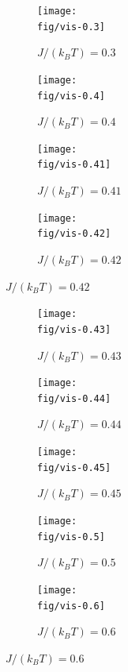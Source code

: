 \documentclass[12pt,a4paper]{article}
\newcommand{\fig}{../fig}
\begin{document}
	\begin{figure}[htb!]
		\centering
		\begin{subfigure}{0.4\linewidth}
			\centering
			\texttt{[image: \\fig/vis-0.3]}
			\caption*{$J/(k_B T) = 0.3$}
		\end{subfigure}
		\begin{subfigure}{0.4\linewidth}
			\centering
			\texttt{[image: \\fig/vis-0.4]}
			\caption*{$J/(k_B T) = 0.4$}
		\end{subfigure}
		\begin{subfigure}{0.4\linewidth}
			\centering
			\texttt{[image: \\fig/vis-0.41]}
			\caption*{$J/(k_B T) = 0.41$}
		\end{subfigure}
		\begin{subfigure}{0.4\linewidth}
			\centering
			\texttt{[image: \\fig/vis-0.42]}
			\caption*{$J/(k_B T) = 0.42$}
		\end{subfigure}
	\end{figure}
	\begin{figure}[htb!]
		\centering
		\begin{subfigure}{0.4\linewidth}
			\centering
			\texttt{[image: \\fig/vis-0.43]}
			\caption*{$J/(k_B T) = 0.43$}
		\end{subfigure}
		\begin{subfigure}{0.4\linewidth}
			\centering
			\texttt{[image: \\fig/vis-0.44]}
			\caption*{$J/(k_B T) = 0.44$}
		\end{subfigure}
		\begin{subfigure}{0.4\linewidth}
			\centering
			\texttt{[image: \\fig/vis-0.45]}
			\caption*{$J/(k_B T) = 0.45$}
		\end{subfigure}
		\begin{subfigure}{0.4\linewidth}
			\centering
			\texttt{[image: \\fig/vis-0.5]}
			\caption*{$J/(k_B T) = 0.5$}
		\end{subfigure}
		\begin{subfigure}{0.4\linewidth}
			\centering
			\texttt{[image: \\fig/vis-0.6]}
			\caption*{$J/(k_B T) = 0.6$}
		\end{subfigure}
	\end{figure}
\end{document}
